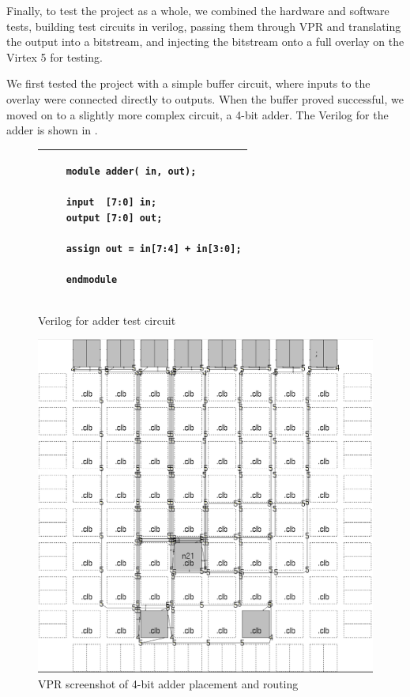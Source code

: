 Finally, to test the project as a whole, we combined the hardware and software tests, building test circuits in verilog, passing them through VPR and translating the output into a bitstream, and injecting the bitstream onto a full overlay on the Virtex 5 for testing.

We first tested the project with a simple buffer circuit, where inputs to the overlay were connected directly to outputs.
When the buffer proved successful, we moved on to a slightly more complex circuit, a 4-bit adder.
The Verilog for the adder is shown in .

\begin{figure}[!h]
	\centering
	\begin{tabular}{|p{13cm}|}
	\hline
	\begin{verbatim}
	module adder( in, out);

	input  [7:0] in;
	output [7:0] out;

	assign out = in[7:4] + in[3:0];

	endmodule
	\end{verbatim}
	\\ \hline
	\end{tabular}
	\caption{Verilog for adder test circuit}
	\label{adder-verilog}
\end{figure}

\begin{figure}[!h]
	\centering
	\includegraphics[scale=0.3]{vpr-adder.png}
	\caption{VPR screenshot of 4-bit adder placement and routing}
	\label{adder-vpr}
\end{figure}

